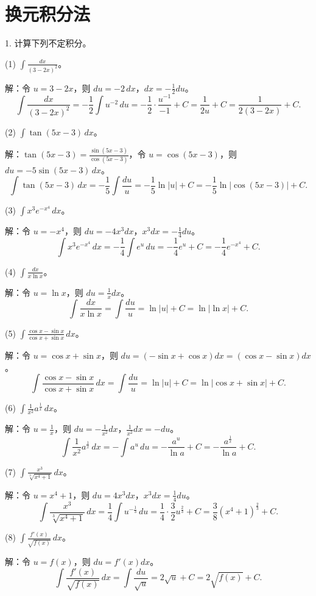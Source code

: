 \section*{换元积分法}

1. 计算下列不定积分。

(1) \(\int\frac{dx}{(3-2x)^{2}}\)。

解：令 \(u=3-2x\)，则 \(du=-2\,dx\)，\(dx=-\frac{1}{2}du\)。
\[ \int\frac{dx}{(3-2x)^{2}}=-\frac{1}{2}\int u^{-2}\,du=-\frac{1}{2}\cdot\frac{u^{-1}}{-1}+C=\frac{1}{2u}+C=\frac{1}{2(3-2x)}+C. \]

(2) \(\int\tan(5x-3)\,dx\)。

解：\(\tan(5x-3)=\frac{\sin(5x-3)}{\cos(5x-3)}\)，令 \(u=\cos(5x-3)\)，则 \(du=-5\sin(5x-3)\,dx\)。
\[ \int\tan(5x-3)\,dx=-\frac{1}{5}\int\frac{du}{u}=-\frac{1}{5}\ln|u|+C=-\frac{1}{5}\ln|\cos(5x-3)|+C. \]

(3) \(\int x^{3}e^{-x^{4}}\,dx\)。

解：令 \(u=-x^{4}\)，则 \(du=-4x^{3}dx\)，\(x^{3}dx=-\frac{1}{4}du\)。
\[ \int x^{3}e^{-x^{4}}\,dx=-\frac{1}{4}\int e^{u}\,du=-\frac{1}{4}e^{u}+C=-\frac{1}{4}e^{-x^{4}}+C. \]

(4) \(\int\frac{dx}{x\ln x}\)。

解：令 \(u=\ln x\)，则 \(du=\frac{1}{x}dx\)。
\[ \int\frac{dx}{x\ln x}=\int\frac{du}{u}=\ln|u|+C=\ln|\ln x|+C. \]

(5) \(\int\frac{\cos x-\sin x}{\cos x+\sin x}\,dx\)。

解：令 \(u=\cos x+\sin x\)，则 \(du=(-\sin x+\cos x)dx=(\cos x-\sin x)dx\)。
\[ \int\frac{\cos x-\sin x}{\cos x+\sin x}\,dx=\int\frac{du}{u}=\ln|u|+C=\ln|\cos x+\sin x|+C. \]

(6) \(\int\frac{1}{x^{2}}a^{\frac{1}{x}}\,dx\)。

解：令 \(u=\frac{1}{x}\)，则 \(du=-\frac{1}{x^{2}}dx\)，\(\frac{1}{x^{2}}dx=-du\)。
\[ \int\frac{1}{x^{2}}a^{\frac{1}{x}}\,dx=-\int a^{u}\,du=-\frac{a^{u}}{\ln a}+C=-\frac{a^{\frac{1}{x}}}{\ln a}+C. \]

(7) \(\int\frac{x^{3}}{\sqrt[3]{x^{4}+1}}\,dx\)。

解：令 \(u=x^{4}+1\)，则 \(du=4x^{3}dx\)，\(x^{3}dx=\frac{1}{4}du\)。
\[ \int\frac{x^{3}}{\sqrt[3]{x^{4}+1}}\,dx=\frac{1}{4}\int u^{-\frac{1}{3}}\,du=\frac{1}{4}\cdot\frac{3}{2}u^{\frac{2}{3}}+C=\frac{3}{8}(x^{4}+1)^{\frac{2}{3}}+C. \]

(8) \(\int\frac{f'(x)}{\sqrt{f(x)}}\,dx\)。

解：令 \(u=f(x)\)，则 \(du=f'(x)dx\)。
\[ \int\frac{f'(x)}{\sqrt{f(x)}}\,dx=\int\frac{du}{\sqrt{u}}=2\sqrt{u}+C=2\sqrt{f(x)}+C. \]

